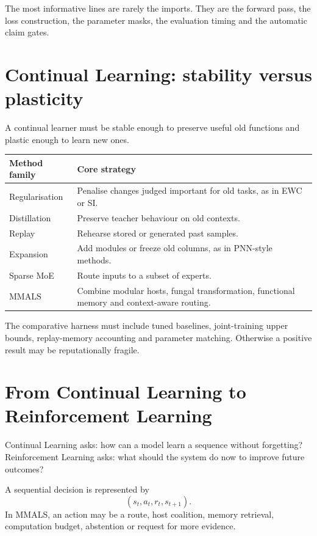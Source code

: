 \documentclass[11pt,a4paper]{article}
\newcommand{\tablehead}[1]{\cellcolor{DeepTeal}\color{white}\bfseries #1}
\begin{document}
\begin{engineerbox}
The most informative lines are rarely the imports. They are the forward pass, the loss construction, the parameter masks, the evaluation timing and the automatic claim gates.
\end{engineerbox}

\section{Continual Learning: stability versus plasticity}

A continual learner must be stable enough to preserve useful old functions and plastic enough to learn new ones.

\begin{tabularx}{\textwidth}{p{3.2cm}X}
\toprule
\tablehead{Method family} & \tablehead{Core strategy}\\
\midrule
Regularisation & Penalise changes judged important for old tasks, as in EWC or SI.\\
Distillation & Preserve teacher behaviour on old contexts.\\
Replay & Rehearse stored or generated past samples.\\
Expansion & Add modules or freeze old columns, as in PNN-style methods.\\
Sparse MoE & Route inputs to a subset of experts.\\
MMALS & Combine modular hosts, fungal transformation, functional memory and context-aware routing.\\
\bottomrule
\end{tabularx}

The comparative harness must include tuned baselines, joint-training upper bounds, replay-memory accounting and parameter matching. Otherwise a positive result may be reputationally fragile.

\newpage
\section{From Continual Learning to Reinforcement Learning}

Continual Learning asks: how can a model learn a sequence without forgetting? Reinforcement Learning asks: what should the system do now to improve future outcomes?

A sequential decision is represented by
\[
(s_t,a_t,r_t,s_{t+1}).
\]
In MMALS, an action may be a route, host coalition, memory retrieval, computation budget, abstention or request for more evidence.
\end{document}
